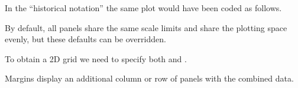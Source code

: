 \documentclass[krantz2]{krantz}\usepackage{knitr}
\begin{document}
In the ``historical notation'' the same plot would have been coded as follows.

\begin{knitrout}\footnotesize
{}\color{fgcolor}\begin{kframe}
\begin{alltt}
 \hlopt{+}  \hlopt{~} 
\end{alltt}
\end{kframe}
\end{knitrout}

By default, all panels share the same scale limits and share the plotting space evenly, but these defaults can be overridden.

\begin{knitrout}\footnotesize
{}\color{fgcolor}\begin{kframe}
\begin{alltt}
 \hlopt{+} \hlstd{(} \hlstd{=}   \hlstd{=} \hlstd{)}
 \hlopt{+} \hlstd{(} \hlstd{=}   \hlstd{=} \hlstd{,}  \hlstd{=} \hlstd{)}
\end{alltt}
\end{kframe}
\end{knitrout}



To obtain a 2D grid we need to specify both  and .

\begin{knitrout}\footnotesize
{}\color{fgcolor}\begin{kframe}
\begin{alltt}
 \hlopt{+} \hlstd{(} \hlstd{=}   \hlstd{=} 
\end{alltt}
\end{kframe}
\end{knitrout}



Margins display an additional column or row of panels with the combined data.
\end{document}
